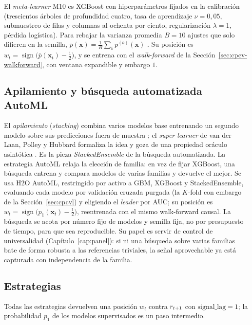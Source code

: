 El \emph{meta-learner} M10 es XGBoost con hiperparámetros fijados en la calibración (trescientos árboles de profundidad cuatro, tasa de aprendizaje $\nu = 0{,}05$, submuestreo de filas y columnas al ochenta por ciento, regularización $\lambda = 1$, pérdida logística). Para rebajar la varianza promedia $B=10$ ajustes que solo difieren en la semilla, $\bar{p}(\mathbf{x}) = \tfrac{1}{B}\sum_b p^{(b)}(\mathbf{x})$ \cite{breiman1996, hastie2009}. Su posición es $w_t = \operatorname{sign}\!\big(\bar{p}(\mathbf{x}_t) - \tfrac{1}{2}\big)$, y se entrena con el \emph{walk-forward} de la Sección~\ref{sec:cpcv-walkforward}, con ventana expandible y embargo $1$.

\subsection{Apilamiento y búsqueda automatizada AutoML}
\label{sec:sup-stacking}
\label{sec:sup-automl}

El \emph{apilamiento} (\emph{stacking}) combina varios modelos base entrenando un segundo modelo sobre sus predicciones fuera de muestra \cite{wolpert1992}; el \emph{super learner} de van der Laan, Polley y Hubbard formaliza la idea y goza de una propiedad oráculo asintótica \cite{vanderlaan2007}. Es la pieza \emph{StackedEnsemble} de la búsqueda automatizada. La estrategia AutoML relaja la elección de familia: en vez de fijar XGBoost, una búsqueda entrena y compara modelos de varias familias y devuelve el mejor. Se usa H2O AutoML, restringido por activo a GBM, XGBoost y StackedEnsemble, evaluando cada modelo por validación cruzada purgada (la $K$-fold con embargo de la Sección~\ref{sec:cpcv}) y eligiendo el \emph{leader} por AUC; su posición es $w_t = \operatorname{sign}\!\big(p_1(\mathbf{x}_t) - \tfrac{1}{2}\big)$, reentrenada con el mismo walk-forward causal. La búsqueda se acota por número fijo de modelos y semilla fija, no por presupuesto de tiempo, para que sea reproducible. Su papel es servir de control de universalidad (Capítulo~\ref{cap:panel}): si ni una búsqueda sobre varias familias bate de forma robusta a las referencias triviales, la señal aprovechable ya está capturada con independencia de la familia.

\subsection{Estrategias}
\label{sec:estrategias-catalogo}

Todas las estrategias devuelven una posición $w_t$ contra $r_{t+1}$ con $\mathrm{signal\_lag} = 1$; la probabilidad $p_1$ de los modelos supervisados es un paso intermedio.


